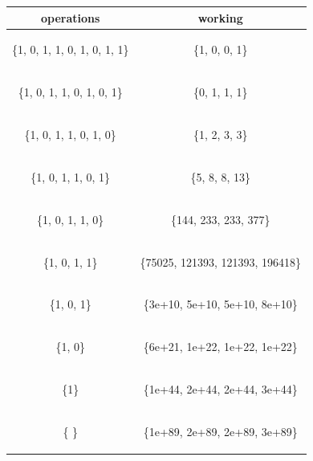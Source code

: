 \documentclass[a4paper,11pt]{article}
\numberwithin{definition}{section}
\numberwithin{mytheorem}{subsection}
\begin{document}
\centering
\begin{tabular}{ |c|c| } 
 \hline
 \textbf{operations} & \textbf{working}  \\ 
 \hline
 \begin{flushleft} \{1, 0, 1, 1, 0, 1, 0, 1, 1\}\end{flushleft} & \{1, 0, 0, 1\}  \\ 
 \hline
 \begin{flushleft} \{1, 0, 1, 1, 0, 1, 0, 1\}\end{flushleft} & \{0, 1, 1, 1\}  \\ 
 \hline
 \begin{flushleft} \{1, 0, 1, 1, 0, 1, 0\}\end{flushleft} & \{1, 2, 3, 3\}  \\ 
 \hline
\begin{flushleft} \{1, 0, 1, 1, 0, 1\}\end{flushleft} & \{5, 8, 8, 13\}  \\ 
 \hline
 \begin{flushleft} \{1, 0, 1, 1, 0\}\end{flushleft} & \{144, 233, 233, 377\}  \\ 
 \hline
 \begin{flushleft} \{1, 0, 1, 1\}\end{flushleft} & \{75025, 121393, 121393, 196418\}  \\ 
 \hline
 \begin{flushleft} \{1, 0, 1\}\end{flushleft} & \{3e+10, 5e+10, 5e+10, 8e+10\}  \\
 \hline
 \begin{flushleft} \{1, 0\}\end{flushleft}  & \{6e+21, 1e+22,  1e+22, 1e+22\}  \\ 
 \hline
 \begin{flushleft} \{1\}\end{flushleft}  & \{1e+44, 2e+44, 2e+44, 3e+44\}  \\
 \hline
 \begin{flushleft} \{ \}\end{flushleft}  & \{1e+89, 2e+89, 2e+89, 3e+89\} \\ 
 
 
 
 
 \hline
\end{tabular}
\end{document}

